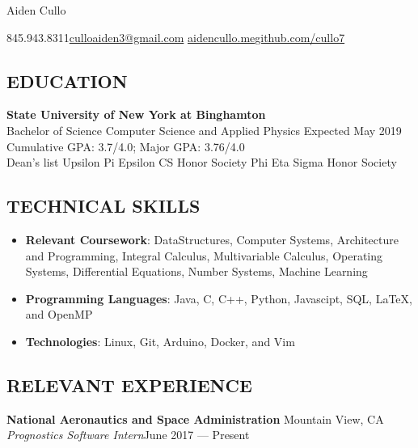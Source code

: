 \documentclass[11pt]{article}
\begin{document}
\centerline{\Huge Aiden Cullo}
\vspace{5mm}
\centerline{\small845.943.8311\sbar \href{mailto:culloaiden3@gmail.com}{culloaiden3@gmail.com} \sbar \href{http://aidencullo.me}{aidencullo.me}\sbar\href{https://github.com/cullo7}{github.com/cullo7}}
\vspace{2mm}
\subsection*{EDUCATION}
\vspace{1mm}
\spacedhrule{0.1em}{0.9em}
\textbf{State University of New York at Binghamton} \\ 
Bachelor of Science Computer Science and Applied Physics Expected May 2019 \\
Cumulative GPA: 3.7/4.0;  Major GPA: 3.76/4.0\\
Dean's list\sbull 
Upsilon Pi Epsilon CS Honor Society\sbull 
Phi Eta Sigma Honor Society \\
\vspace{2mm}
\subsection*{TECHNICAL SKILLS}
\vspace{1mm}
\spacedhrule{0.1em}{0.9em}
\begin{itemize}
  \item \textbf{Relevant Coursework}: DataStructures, Computer Systems, Architecture and Programming, Integral Calculus, Multivariable Calculus, Operating Systems, Differential Equations, Number Systems, Machine Learning
  \item	\textbf{Programming Languages}: Java, C, C++, Python, Javascipt, SQL, \LaTeX, and OpenMP
  \item \textbf{Technologies}: Linux, Git, Arduino, Docker, and Vim
\end{itemize}
\vspace{2mm}
\subsection*{RELEVANT EXPERIENCE}
\vspace{1mm}
\spacedhrule{0.1em}{0.9em}
\textbf{National Aeronautics and Space Administration \hfill} Mountain View, CA \\ 
\textit{Prognostics Software Intern}\hfill June 2017 — Present \\
\end{document}
